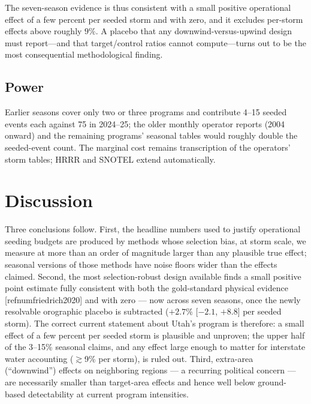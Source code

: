 \documentclass[9pt,twocolumn,twoside]{article}
\newcommand{\citeparen}[1]{[\csname refnum#1\endcsname]}
\begin{document}
The seven-season evidence is thus consistent with a small positive operational
effect of a few percent per seeded storm and with zero, and it excludes
per-storm effects above roughly $9\%$. A placebo that any downwind-versus-upwind
design must report---and that target/control ratios cannot compute---turns out
to be the most consequential methodological finding.

\subsection{Power}
Earlier seasons cover only two or three programs and contribute 4--15 seeded
events each against 75 in 2024--25; the older monthly operator reports
(2004 onward) and the remaining programs' seasonal tables would roughly
double the seeded-event count. The marginal cost remains transcription of the
operators' storm tables; HRRR and SNOTEL extend automatically.

\section{Discussion}

Three conclusions follow. First, the headline numbers used to justify
operational seeding budgets are produced by methods whose selection bias, at
storm scale, we measure at more than an order of magnitude larger than any
plausible true effect; seasonal versions of those methods have noise floors
wider than the effects claimed. Second, the most selection-robust design
available finds a small positive point estimate fully consistent with both
the gold-standard physical evidence \citeparen{friedrich2020} and with zero
--- now across seven seasons, once the newly resolvable orographic placebo is
subtracted ($+2.7\%$ [$-2.1$, $+8.8$] per seeded storm). The correct current
statement about Utah's program is therefore: a small effect of a few percent
per seeded storm is plausible and unproven; the upper half of the 3--15\%
seasonal claims, and any effect large enough to matter for interstate water
accounting ($\gtrsim$9\% per storm), is ruled out. Third, extra-area
(``downwind'') effects on neighboring regions --- a recurring political
concern --- are necessarily smaller than target-area effects and hence well
below ground-based detectability at current program intensities.
\end{document}
